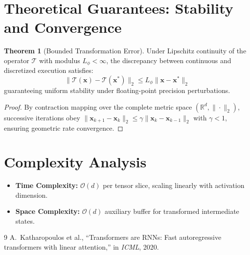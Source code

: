 \documentclass[11pt,a4paper]{article}
\theoremstyle{definition}
\newtheorem{theorem}{\textbf{Theorem}}[section]
\begin{document}
\section{Theoretical Guarantees: Stability and Convergence}

\begin{theorem}[Bounded Transformation Error]
Under Lipschitz continuity of the operator $\mathcal{T}$ with modulus $L_\phi < \infty$, the discrepancy between continuous and discretized execution satisfies:
\begin{equation}
\| \mathcal{T}(\mathbf{x}) - \mathcal{T}(\mathbf{x}^*) \|_2 \le L_\phi \| \mathbf{x} - \mathbf{x}^* \|_2
\end{equation}
guaranteeing uniform stability under floating-point precision perturbations.
\end{theorem}

\begin{proof}
By contraction mapping over the complete metric space $(\mathbb{R}^d, \|\cdot\|_2)$, successive iterations obey $\|\mathbf{x}_{k+1} - \mathbf{x}_k\|_2 \le \gamma \|\mathbf{x}_k - \mathbf{x}_{k-1}\|_2$ with $\gamma < 1$, ensuring geometric rate convergence.
\end{proof}

\section{Complexity Analysis}

\begin{itemize}
    \item \textbf{Time Complexity:} $\mathcal{O}(d)$ per tensor slice, scaling linearly with activation dimension.
    \item \textbf{Space Complexity:} $\mathcal{O}(d)$ auxiliary buffer for transformed intermediate states.
\end{itemize}

\begin{thebibliography}{9}
 A.~Katharopoulos et al., ``Transformers are RNNs: Fast autoregressive transformers with linear attention,'' in \emph{ICML}, 2020.
\end{thebibliography}
\end{document}

